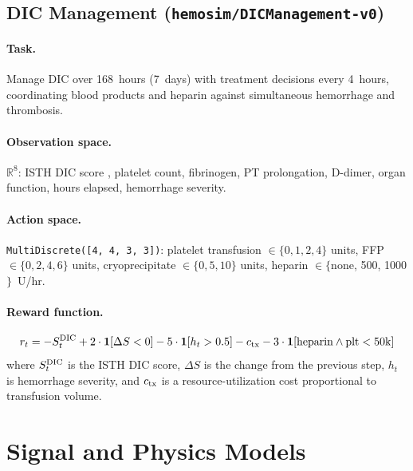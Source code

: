 \documentclass[11pt]{article}
\begin{document}
\subsection{DIC Management (\texttt{hemosim/DICManagement-v0})}

\paragraph{Task.} Manage DIC over 168~hours (7~days) with treatment decisions every 4~hours, coordinating blood products and heparin against simultaneous hemorrhage and thrombosis.

\paragraph{Observation space.} $\mathbb{R}^{8}$: ISTH DIC score \citep{taylor2001}, platelet count, fibrinogen, PT prolongation, D-dimer, organ function, hours elapsed, hemorrhage severity.

\paragraph{Action space.} \texttt{MultiDiscrete([4, 4, 3, 3])}: platelet transfusion $\in \{0, 1, 2, 4\}$ units, FFP $\in \{0, 2, 4, 6\}$ units, cryoprecipitate $\in \{0, 5, 10\}$ units, heparin $\in \{$none, 500, 1000$\}$~U/hr.

\paragraph{Reward function.}
\begin{equation}
  r_t = -S_t^{\rm DIC} + 2 \cdot \mathbf{1}[\Delta S < 0] - 5 \cdot \mathbf{1}[h_t > 0.5] - c_{\rm tx} - 3 \cdot \mathbf{1}[\text{heparin} \wedge \text{plt} < 50\text{k}]
  \label{eq:dic_reward}
\end{equation}
where $S_t^{\rm DIC}$ is the ISTH DIC score, $\Delta S$ is the change from the previous step, $h_t$ is hemorrhage severity, and $c_{\rm tx}$ is a resource-utilization cost proportional to transfusion volume.

\section{Signal and Physics Models}
\label{sec:models}
\end{document}
